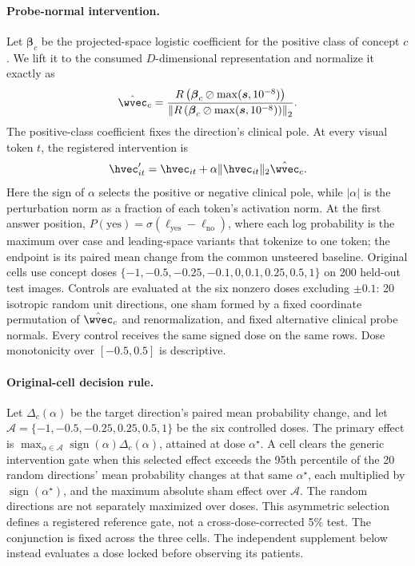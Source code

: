\paragraph{Probe-normal intervention.}
Let $\boldsymbol\beta_c$ be the projected-space logistic coefficient for the positive class of concept $c$. We lift it to the consumed $D$-dimensional representation and normalize it exactly as
\begin{equation}
\hat\wvec_c = \frac{R\left(\boldsymbol\beta_c\oslash\max(\boldsymbol{s},10^{-8})\right)}{\left\lVert R\left(\boldsymbol\beta_c\oslash\max(\boldsymbol{s},10^{-8})\right)\right\rVert_2}.
\label{eq:seed-lift}
\end{equation}
The positive-class coefficient fixes the direction's clinical pole. At every visual token $t$, the registered intervention is
\begin{equation}
\hvec'_{it}=\hvec_{it}+\alpha\lVert\hvec_{it}\rVert_2\hat\wvec_c.
\label{eq:seed-intervention}
\end{equation}
Here the sign of $\alpha$ selects the positive or negative clinical pole, while $|\alpha|$ is the perturbation norm as a fraction of each token's activation norm. At the first answer position, $P(\mathrm{yes})=\sigma(\ell_{\mathrm{yes}}-\ell_{\mathrm{no}})$, where each log probability is the maximum over case and leading-space variants that tokenize to one token; the endpoint is its paired mean change from the common unsteered baseline. Original cells use concept doses $\{-1,-0.5,-0.25,-0.1,0,0.1,0.25,0.5,1\}$ on 200 held-out test images. Controls are evaluated at the six nonzero doses excluding $\pm0.1$: 20 isotropic random unit directions, one sham formed by a fixed coordinate permutation of $\hat\wvec_c$ and renormalization, and fixed alternative clinical probe normals. Every control receives the same signed dose on the same rows. Dose monotonicity over $[-0.5,0.5]$ is descriptive.

\paragraph{Original-cell decision rule.}
Let $\Delta_c(\alpha)$ be the target direction's paired mean probability change, and let $\mathcal A=\{-1,-0.5,-0.25,0.25,0.5,1\}$ be the six controlled doses. The primary effect is $\max_{\alpha\in\mathcal A}\operatorname{sign}(\alpha)\Delta_c(\alpha)$, attained at dose $\alpha^\star$. A cell clears the generic intervention gate when this selected effect exceeds the 95th percentile of the 20 random directions' mean probability changes at that same $\alpha^\star$, each multiplied by $\operatorname{sign}(\alpha^\star)$, and the maximum absolute sham effect over $\mathcal A$. The random directions are not separately maximized over doses. This asymmetric selection defines a registered reference gate, not a cross-dose-corrected 5\% test. The conjunction is fixed across the three cells. The independent supplement below instead evaluates a dose locked before observing its patients.

